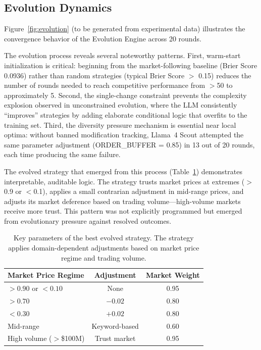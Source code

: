 \subsection{Evolution Dynamics}

Figure~\ref{fig:evolution} (to be generated from experimental data) illustrates the convergence behavior of the Evolution Engine across 20 rounds.

The evolution process reveals several noteworthy patterns. First, warm-start initialization is critical: beginning from the market-following baseline (Brier Score 0.0936) rather than random strategies (typical Brier Score $>$ 0.15) reduces the number of rounds needed to reach competitive performance from $>$50 to approximately 5. Second, the single-change constraint prevents the complexity explosion observed in unconstrained evolution, where the LLM consistently ``improves'' strategies by adding elaborate conditional logic that overfits to the training set. Third, the diversity pressure mechanism is essential near local optima: without banned modification tracking, Llama~4 Scout attempted the same parameter adjustment (ORDER\_BUFFER = 0.85) in 13 out of 20 rounds, each time producing the same failure.

The evolved strategy that emerged from this process (Table~\ref{tab:evolved_strategy}) demonstrates interpretable, auditable logic. The strategy trusts market prices at extremes ($>$0.9 or $<$0.1), applies a small contrarian adjustment in mid-range prices, and adjusts its market deference based on trading volume---high-volume markets receive more trust. This pattern was not explicitly programmed but emerged from evolutionary pressure against resolved outcomes.

\begin{table}[t]
\centering
\caption{Key parameters of the best evolved strategy. The strategy applies domain-dependent adjustments based on market price regime and trading volume.}
\label{tab:evolved_strategy}
\small
\begin{tabular}{@{}lcc@{}}
\toprule
Market Price Regime & Adjustment & Market Weight \\ \midrule
$> 0.90$ or $< 0.10$ & None & 0.95 \\
$> 0.70$ & $-0.02$ & 0.80 \\
$< 0.30$ & $+0.02$ & 0.80 \\
Mid-range & Keyword-based & 0.60 \\
High volume ($>$\$100M) & Trust market & 0.95 \\
\bottomrule
\end{tabular}
\end{table}

